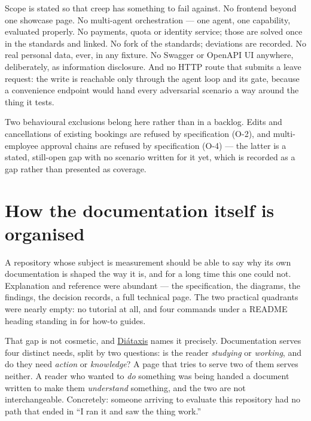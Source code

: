 \documentclass[11pt,a4paper]{article}
\begin{document}
Scope is stated so that creep has something to fail against. No frontend beyond
one showcase page. No multi-agent orchestration --- one agent, one capability,
evaluated properly. No payments, quota or identity service; those are solved
once in the standards and linked. No fork of the standards; deviations are
recorded. No real personal data, ever, in any fixture. No Swagger or OpenAPI UI
anywhere, deliberately, as information disclosure. And no HTTP route that
submits a leave request: the write is reachable only through the agent loop and
its gate, because a convenience endpoint would hand every adversarial scenario a
way around the thing it tests.

Two behavioural exclusions belong here rather than in a backlog. Edits and
cancellations of existing bookings are refused by specification (O-2), and
multi-employee approval chains are refused by specification (O-4) --- the latter
is a stated, still-open gap with no scenario written for it yet, which is
recorded as a gap rather than presented as coverage.

\section{How the documentation itself is organised}

A repository whose subject is measurement should be able to say why its own
documentation is shaped the way it is, and for a long time this one could not.
Explanation and reference were abundant --- the specification, the diagrams,
the findings, the decision records, a full technical page. The two practical
quadrants were nearly empty: no tutorial at all, and four commands under a
README heading standing in for how-to guides.

That gap is not cosmetic, and \href{https://diataxis.fr/}{Di\'{a}taxis} names it
precisely. Documentation serves four distinct needs, split by two questions:
is the reader \emph{studying} or \emph{working}, and do they need \emph{action}
or \emph{knowledge}? A page that tries to serve two of them serves neither.
A reader who wanted to \emph{do} something was being handed a document written
to make them \emph{understand} something, and the two are not interchangeable.
Concretely: someone arriving to evaluate this repository had no path that ended
in ``I ran it and saw the thing work.''
\end{document}
